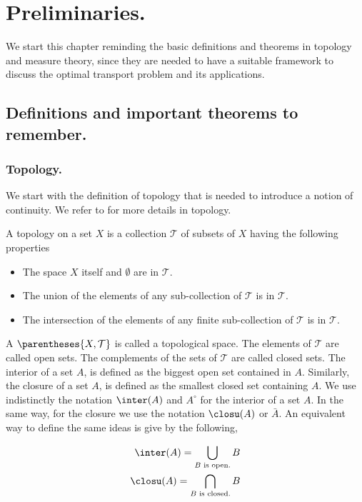 \chapter{Preliminaries.}
We start this chapter reminding the basic definitions and theorems in topology and measure theory, since they are needed to have a suitable framework to discuss the optimal transport problem and its applications.

 
\section{Definitions and important theorems to remember.}

\subsection{Topology.}
We start with the definition of topology that is needed to introduce a notion of continuity. We refer to \cite{munkres2000topology} for more details in topology. 

\begin{definition}[Topology]
	A topology on a set $X$ is a collection $\mathcal T$ of subsets of $X$ having the following properties
	\begin{itemize}
		\item  The space $X$ itself and $\emptyset$ are in $\mathcal T$.
		\item  The union of the elements of any sub-collection of $\mathcal T$ is in $\mathcal T$.
		\item The intersection of the elements of any finite sub-collection of $\mathcal T$ is in $\mathcal T$.
	\end{itemize}
\end{definition}

A  $\parentheses{X, \mathcal{T}}$ is called a topological space. The elements of $\mathcal T$ are called open sets. The complements of the sets of $\mathcal T$ are called closed sets. The interior of a set $A$, is defined as the biggest open set contained in $A$. Similarly, the closure of a set $A$, is defined as the smallest closed set containing $A$. We use indistinctly the notation $\inter(A)$ and $A^{\circ}$ for the interior of a set $A$. In the same way, for the closure we use the notation $\closu(A)$ or $\bar{A}$. An equivalent way to define the same ideas is give by the following,

\begin{align*}
	\inter(A)=\bigcup_{B \text{ is open.}} B \\
	\closu(A)=\bigcap_{B \text{ is closed.}} B
\end{align*}

